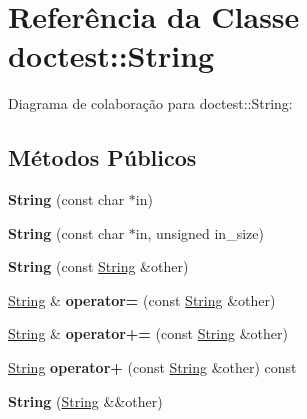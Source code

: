 \hypertarget{classdoctest_1_1String}{}\section{Referência da Classe doctest\+:\+:String}
\label{classdoctest_1_1String}


Diagrama de colaboração para doctest\+:\+:String\+:
\subsection*{Métodos Públicos}
\begin{DoxyCompactItemize}
\item 
\mbox{\label{classdoctest_1_1String_abb4449cbc613cd973ae774c704fca5dd}} 
{\bfseries String} (const char $\ast$in)
\item 
\mbox{\label{classdoctest_1_1String_a01d9f84ab0a3dc67b195678b6073dd4c}} 
{\bfseries String} (const char $\ast$in, unsigned in\+\_\+size)
\item 
\mbox{\label{classdoctest_1_1String_a27ca7976da20bdebbf225fa496c38ad1}} 
{\bfseries String} (const \hyperlink{classdoctest_1_1String}{String} \&other)
\item 
\mbox{\label{classdoctest_1_1String_a1979700c536cfe9b5fecc328245f74ca}} 
\hyperlink{classdoctest_1_1String}{String} \& {\bfseries operator=} (const \hyperlink{classdoctest_1_1String}{String} \&other)
\item 
\mbox{\label{classdoctest_1_1String_ad1df797f12cd140e3d1739f2b30b64d2}} 
\hyperlink{classdoctest_1_1String}{String} \& {\bfseries operator+=} (const \hyperlink{classdoctest_1_1String}{String} \&other)
\item 
\mbox{\label{classdoctest_1_1String_a6ddb6cf1b744a0ae1d4e26b3c8dfa827}} 
\hyperlink{classdoctest_1_1String}{String} {\bfseries operator+} (const \hyperlink{classdoctest_1_1String}{String} \&other) const
\item 
\mbox{\label{classdoctest_1_1String_a4bbdcb36cd68988953c3bb2d18e53210}} 
{\bfseries String} (\hyperlink{classdoctest_1_1String}{String} \&\&other)

\end{DoxyCompactItemize}
